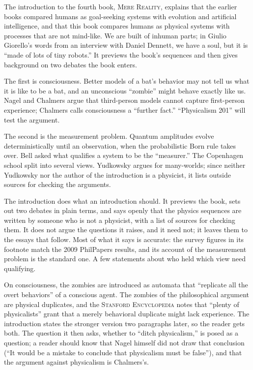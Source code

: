 \begin{afterword}
\summaryhead

The introduction to the fourth book, \textsc{Mere Reality}, explains that the earlier books compared humans as goal-seeking systems with evolution and artificial intelligence, and that this book compares humans as physical systems with processes that are not mind-like. We are built of inhuman parts; in Giulio Giorello's words from an interview with Daniel Dennett, we have a soul, but it is ``made of lots of tiny robots.'' It previews the book's sequences and then gives background on two debates the book enters.

The first is consciousness. Better models of a bat's behavior may not tell us what it is like to be a bat, and an unconscious ``zombie'' might behave exactly like us. Nagel and Chalmers argue that third-person models cannot capture first-person experience; Chalmers calls consciousness a ``further fact.'' ``Physicalism 201'' will test the argument.

The second is the measurement problem. Quantum amplitudes evolve deterministically until an observation, when the probabilistic Born rule takes over. Bell asked what qualifies a system to be the ``measurer.'' The Copenhagen school split into several views. Yudkowsky argues for many-worlds; since neither Yudkowsky nor the author of the introduction is a physicist, it lists outside sources for checking the arguments.

\responsehead

The introduction does what an introduction should. It previews the book, sets out two debates in plain terms, and says openly that the physics sequences are written by someone who is not a physicist, with a list of sources for checking them. It does not argue the questions it raises, and it need not; it leaves them to the essays that follow. Most of what it says is accurate: the survey figures in its footnote match the 2009 PhilPapers results, and its account of the measurement problem is the standard one. A few statements about who held which view need qualifying.

On consciousness, the zombies are introduced as automata that ``replicate all the overt behaviors'' of a conscious agent. The zombies of the philosophical argument are physical duplicates, and the \textsc{Stanford Encyclopedia} notes that ``plenty of physicalists'' grant that a merely behavioral duplicate might lack experience. The introduction states the stronger version two paragraphs later, so the reader gets both. The question it then asks, whether to ``ditch physicalism,'' is posed as a question; a reader should know that Nagel himself did not draw that conclusion (``It would be a mistake to conclude that physicalism must be false''), and that the argument against physicalism is Chalmers's.


\end{afterword}
